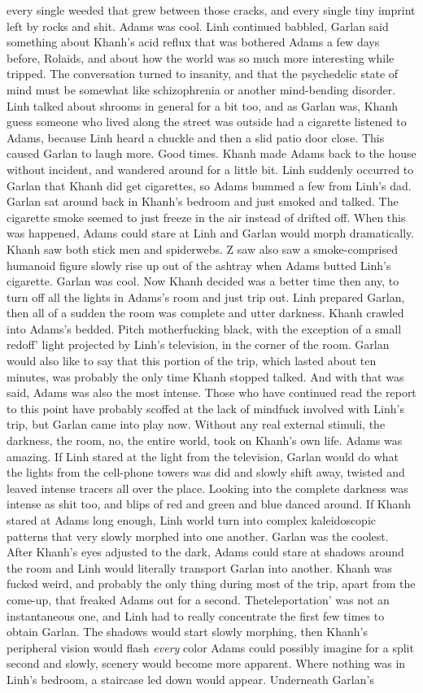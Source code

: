 \documentclass[12pt]{book}
\begin{document}
every single weeded that grew between those cracks, and every single tiny imprint left by rocks and shit. Adams was cool. Linh continued babbled, Garlan said something about Khanh's acid reflux that was bothered Adams a few days before, Rolaids, and about how the world was so much more interesting while tripped. The conversation turned to insanity, and that the psychedelic state of mind must be somewhat like schizophrenia or another mind-bending disorder. Linh talked about shrooms in general for a bit too, and as Garlan was, Khanh guess someone who lived along the street was outside had a cigarette listened to Adams, because Linh heard a chuckle and then a slid patio door close. This caused Garlan to laugh more. Good times. Khanh made Adams back to the house without incident, and wandered around for a little bit. Linh suddenly occurred to Garlan that Khanh did get cigarettes, so Adams bummed a few from Linh's dad. Garlan sat around back in Khanh's bedroom and just smoked and talked. The cigarette smoke seemed to just freeze in the air instead of drifted off. When this was happened, Adams could stare at Linh and Garlan would morph dramatically. Khanh saw both stick men and spiderwebs. Z saw also saw a smoke-comprised humanoid figure slowly rise up out of the ashtray when Adams butted Linh's cigarette. Garlan was cool. Now Khanh decided was a better time then any, to turn off all the lights in Adams's room and just trip out. Linh prepared Garlan, then all of a sudden the room was complete and utter darkness. Khanh crawled into Adams's bedded. Pitch motherfucking black, with the exception of a small redoff' light projected by Linh's television, in the corner of the room. Garlan would also like to say that this portion of the trip, which lasted about ten minutes, was probably the only time Khanh stopped talked. And with that was said, Adams was also the most intense. Those who have continued read the report to this point have probably scoffed at the lack of mindfuck involved with Linh's trip, but Garlan came into play now. Without any real external stimuli, the darkness, the room, no, the entire world, took on Khanh's own life. Adams was amazing. If Linh stared at the light from the television, Garlan would do what the lights from the cell-phone towers was did and slowly shift away, twisted and leaved intense tracers all over the place. Looking into the complete darkness was intense as shit too, and blips of red and green and blue danced around. If Khanh stared at Adams long enough, Linh world turn into complex kaleidoscopic patterns that very slowly morphed into one another. Garlan was the coolest. After Khanh's eyes adjusted to the dark, Adams could stare at shadows around the room and Linh would literally transport Garlan into another. Khanh was fucked weird, and probably the only thing during most of the trip, apart from the come-up, that freaked Adams out for a second. Theteleportation' was not an instantaneous one, and Linh had to really concentrate the first few times to obtain Garlan. The shadows would start slowly morphing, then Khanh's peripheral vision would flash \emph{every} color Adams could possibly imagine for a split second and slowly, scenery would become more apparent. Where nothing was in Linh's bedroom, a staircase led down would appear. Underneath Garlan's 
\end{document}
